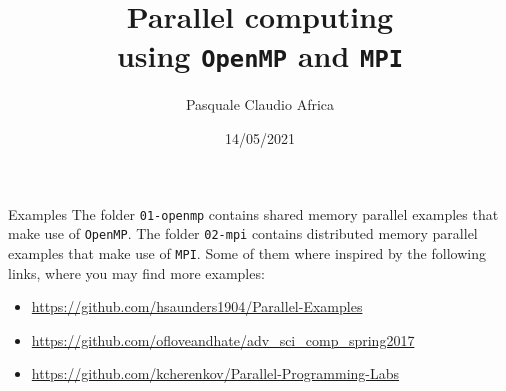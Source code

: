 \documentclass[10pt]{beamer}
\begin{document}
    \title{Parallel computing\protect\\using \texttt{OpenMP} and \texttt{MPI}}
    \author{Pasquale Claudio Africa}
    \date{14/05/2021}

\begin{frame}
    \maketitle
\end{frame}

\begin{frame}{Examples}
The folder \texttt{01-openmp} contains shared memory parallel examples that make use of \texttt{OpenMP}.
\vfill
The folder \texttt{02-mpi} contains distributed memory parallel examples that make use of \texttt{MPI}.
\vfill
Some of them where inspired by the following links, where you may find more examples:
\begin{itemize}
    \item \url{https://github.com/hsaunders1904/Parallel-Examples}
    \item \url{https://github.com/ofloveandhate/adv_sci_comp_spring2017}
    \item \url{https://github.com/kcherenkov/Parallel-Programming-Labs}
\end{itemize}
\end{frame}
\end{document}
